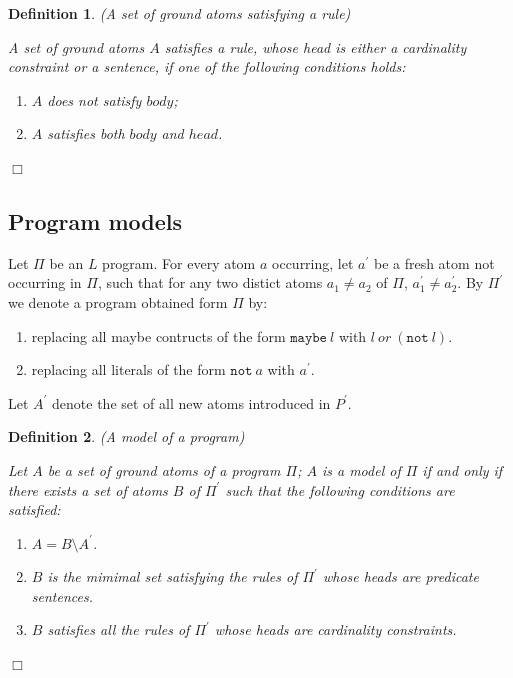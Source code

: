 \documentclass[a4paper,10pt]{article}
\newtheorem{definition}{Definition}
\begin{document}
\begin{definition}(A set of ground atoms satisfying a rule)\\
\rm{
A set of ground atoms $A$ satisfies a rule, whose head is either a cardinality constraint or a sentence, if one of the following conditions holds:
\begin{enumerate}
\item $A$ does not satisfy $body$;
\item $A$ satisfies both $body$ and $head$.
\end{enumerate}
}
\hfill $\Box$
\end{definition}




\subsection{Program models}

Let $\Pi$ be an $L$ program.
For every atom $a$ occurring, let $a^\prime$ be a fresh atom not occurring in $\Pi$, such that for any two distict atoms $a_1 \not= a_2$ of $\Pi$, $a^\prime_1 \not= a^\prime_2$.
By $\Pi^\prime$ we denote a program obtained form $\Pi$ by:

\begin{enumerate}
\item replacing all maybe contructs of the form $\texttt{maybe}~l$ with $l~or~(\texttt{not}~l)$.
\item replacing all literals of the form $\texttt{not}~a$ with $a^\prime$. 
\end{enumerate}

Let $A^\prime$ denote the set of all new atoms introduced in $P^\prime$.


\begin{definition}(A model of a program)\\
\rm{
Let $A$ be a set of ground atoms of a program $\Pi$; $A$ is a model of $\Pi$ if and only if 
there exists a set of atoms $B$ of $\Pi^\prime$ such that  the following conditions are satisfied:
\begin{enumerate}
\item $A = B \setminus A^\prime$.
\item $B$ is the mimimal set satisfying the rules of $\Pi^\prime$ whose heads are predicate sentences.
\item $B$ satisfies all the rules of $\Pi^\prime$ whose heads are cardinality constraints.
\end{enumerate}
}
\hfill$\Box$
\end{definition}
\end{document}
